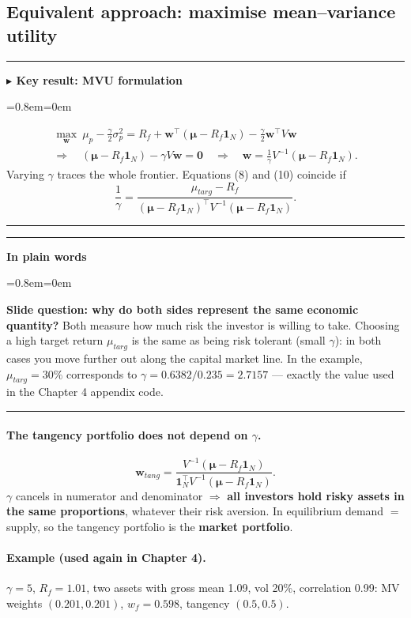\documentclass[11pt,a4paper]{report}
\newenvironment{notebox}[1]
  {\par\medskip\Needspace{6\baselineskip}\noindent\rule{\linewidth}{0.4pt}\par\nopagebreak
   \noindent\textbf{#1}\par\nopagebreak
   \begin{list}{}{\leftmargin=0.8em\rightmargin=0em\topsep=2pt}\item[]}
  {\end{list}\nopagebreak\noindent\rule{\linewidth}{0.4pt}\par\medskip}
\newenvironment{keybox}[1][]{\begin{notebox}{$\blacktriangleright$ Key result#1}}{\end{notebox}}
\newenvironment{plainbox}{\begin{notebox}{In plain words}}{\end{notebox}}
\newcommand{\one}{\mathbf{1}_N}
\newcommand{\w}{\bm{w}}
\newcommand{\T}{^{\top}}
\newcommand{\mub}{\bm{\mu}}
\begin{document}
\subsection{Equivalent approach: maximise mean--variance utility}
\begin{keybox}[: MVU formulation]
\begin{gather*}
\max_{\w}\ \mu_p-\frac\gamma2\sigma_p^2=R_f+\w\T(\mub-R_f\one)-\frac\gamma2\w\T V\w\\
\Rightarrow\quad
(\mub-R_f\one)-\gamma V\w=\bm 0
\quad\Rightarrow\quad
\boxed{\w=\frac1\gamma V^{-1}(\mub-R_f\one)} . \tag{10}
\end{gather*}
Varying $\gamma$ traces the whole frontier. Equations (8) and (10) coincide if
\[
\frac1\gamma=\frac{\mu_{targ}-R_f}{(\mub-R_f\one)\T V^{-1}(\mub-R_f\one)} .
\]
\end{keybox}
\begin{plainbox}
\textbf{Slide question: why do both sides represent the same economic quantity?}
Both measure how much risk the investor is willing to take. Choosing a high
target return $\mu_{targ}$ is the same as being risk tolerant (small $\gamma$):
in both cases you move further out along the capital market line. In the
example, $\mu_{targ}=30\%$ corresponds to $\gamma=0.6382/0.235=2.7157$ --- exactly
the value used in the Chapter 4 appendix code.
\end{plainbox}

\paragraph{The tangency portfolio does not depend on $\gamma$.}
\[
\w_{tang}=\frac{V^{-1}(\mub-R_f\one)}{\one\T V^{-1}(\mub-R_f\one)} .
\]
$\gamma$ cancels in numerator and denominator $\Rightarrow$ \textbf{all investors
hold risky assets in the same proportions}, whatever their risk aversion. In
equilibrium demand $=$ supply, so the tangency portfolio is the
\textbf{market portfolio}.

\paragraph{Example (used again in Chapter 4).} $\gamma=5$, $R_f=1.01$, two assets with
gross mean 1.09, vol 20\%, correlation 0.99: MV weights $(0.201,0.201)$,
$w_f=0.598$, tangency $(0.5,0.5)$.
\end{document}
